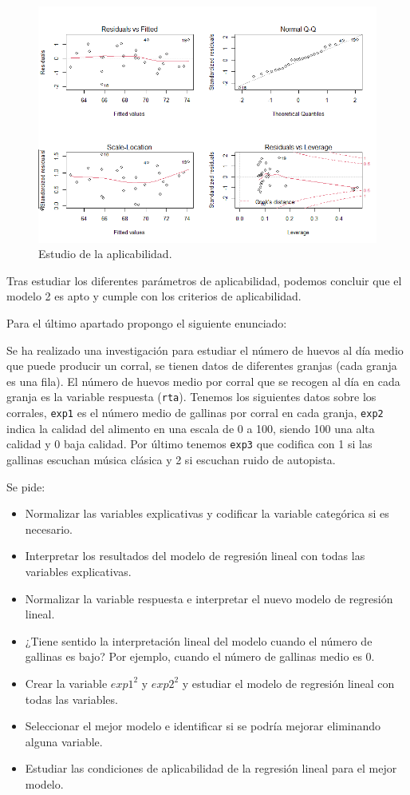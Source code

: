 \documentclass[a4paper]{article}
\begin{document}
\begin{figure}
\centering
\includegraphics[width=1\textwidth]{ej6.png}
\caption{\label{fig:f6}Estudio de la aplicabilidad.}
\end{figure}
Tras estudiar los diferentes parámetros de aplicabilidad, podemos concluir que el modelo 2 es apto y cumple con los criterios de aplicabilidad. \par
Para el último apartado propongo el siguiente enunciado:\par
Se ha realizado una investigación para estudiar el número de huevos al día medio que puede producir un corral, se tienen datos de diferentes granjas (cada granja es una fila). El número de huevos medio por corral que se recogen al día en cada granja es la variable respuesta (\verb|rta|). Tenemos los siguientes datos sobre los corrales, \verb|exp1| es el número medio de gallinas por corral en cada granja, \verb|exp2| indica la calidad del alimento en una escala de 0 a 100, siendo 100 una alta calidad y 0 baja calidad. Por último tenemos \verb|exp3| que codifica con 1 si las gallinas escuchan música clásica y 2 si escuchan ruido de autopista.\par
Se pide:\par
\begin{itemize}
\item Normalizar las variables explicativas y codificar la variable categórica si es necesario.
\item Interpretar los resultados del modelo de regresión lineal con todas las variables explicativas.
\item Normalizar la variable respuesta e interpretar el nuevo modelo de regresión lineal.
\item ¿Tiene sentido la interpretación lineal del modelo cuando el número de gallinas es bajo? Por ejemplo, cuando el número de gallinas medio es 0.
\item Crear la variable $exp1^2$ y $exp2^2$ y estudiar el modelo de regresión lineal con todas las variables.
\item Seleccionar el mejor modelo e identificar si se podría mejorar eliminando alguna variable.
\item Estudiar las condiciones de aplicabilidad de la regresión lineal para el mejor modelo.
\end{itemize}
\end{document}
